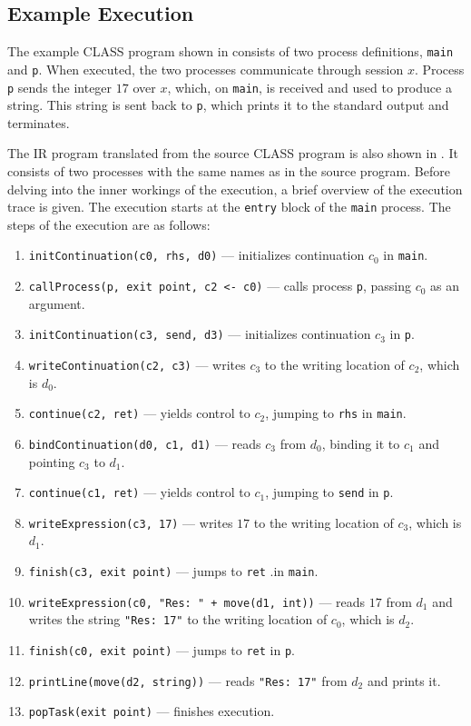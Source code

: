 \subsection{Example Execution}

The example \ac{CLASS} program shown in  consists of two process definitions, \texttt{main} and \texttt{p}. When executed, the two processes communicate through session $x$. Process \texttt{p} sends the integer $17$ over $x$, which, on \texttt{main}, is received and used to produce a string. This string is sent back to \texttt{p}, which prints it to the standard output and terminates.

The \ac{IR} program translated from the source \ac{CLASS} program is also shown in . It consists of two processes with the same names as in the source program. Before delving into the inner workings of the execution, a brief overview of the execution trace is given. The execution starts at the \texttt{entry} block of the \texttt{main} process. The steps of the execution are as follows:

\begin{enumerate}[leftmargin=*, label=\textbf{Step \arabic*:}, itemsep=1pt, parsep=0pt]
  \item \texttt{initContinuation(c0, rhs, d0)} --- initializes continuation $c_0$ in \texttt{main}.
  \item \texttt{callProcess(p, exit point, c2 <- c0)} --- calls process \texttt{p}, passing $c_0$ as an argument.
  \item \texttt{initContinuation(c3, send, d3)} --- initializes continuation $c_3$ in \texttt{p}.
  \item \texttt{writeContinuation(c2, c3)} --- writes $c_3$ to the writing location of $c_2$, which is $d_0$.
  \item \texttt{continue(c2, ret)} --- yields control to $c_2$, jumping to \texttt{rhs} in \texttt{main}.
  \item \texttt{bindContinuation(d0, c1, d1)} --- reads $c_3$ from $d_0$, binding it to $c_1$ and pointing $c_3$ to $d_1$.
  \item \texttt{continue(c1, ret)} --- yields control to $c_1$, jumping to \texttt{send} in \texttt{p}.
  \item \texttt{writeExpression(c3, 17)} --- writes $17$ to the writing location of $c_3$, which is $d_1$.
  \item \texttt{finish(c3, exit point)} --- jumps to \texttt{ret} .in \texttt{main}.
  \item \texttt{writeExpression(c0, "Res:\ " + move(d1, int))} --- reads $17$ from $d_1$ and writes the string \texttt{"Res:\ 17"} to the writing location of $c_0$, which is $d_2$.
  \item \texttt{finish(c0, exit point)} --- jumps to \texttt{ret} in \texttt{p}.
  \item \texttt{printLine(move(d2, string))} --- reads \texttt{"Res:\ 17"} from $d_2$ and prints it.
  \item \texttt{popTask(exit point)} --- finishes execution.
\end{enumerate}

